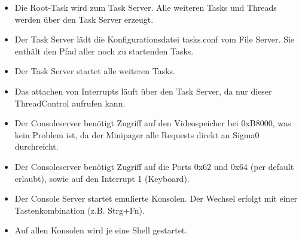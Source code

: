 \begin{itemize}
	\item Die Root-Task wird zum Task Server. Alle weiteren Tasks und Threads werden über den Task Server erzeugt.
	
	\item Der Task Server lädt die Konfigurationsdatei tasks.conf vom File Server. Sie enthält den Pfad aller noch zu startenden Tasks.
	
	\item Der Task Server startet alle weiteren Tasks.
	
	\item Das attachen von Interrupts läuft über den Task Server, da nur dieser ThreadControl aufrufen kann.
	
	\item Der Consoleserver benötigt Zugriff auf den Videospeicher bei 0xB8000, was kein Problem ist, da der Minipager alle Requests direkt an Sigma0 durchreicht.
	
	\item Der Consoleserver benötigt Zugriff auf die Ports 0x62 und 0x64 (per default erlaubt), sowie auf den Interrupt 1 (Keyboard).

	\item Der Console Server startet emulierte Konsolen. Der Wechsel erfolgt mit einer Tastenkombination (z.B. Strg+Fn).
	
	\item Auf allen Konsolen wird je eine Shell gestartet.
\end{itemize}
